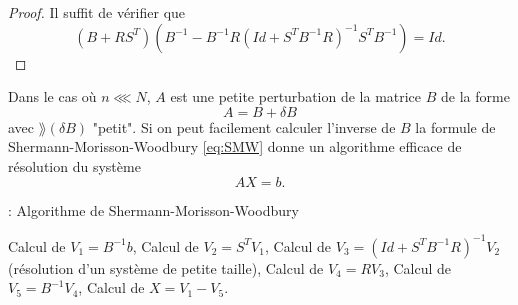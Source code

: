 \begin{proof}
Il suffit de vérifier que 
\begin{equation}
\left( B + R S^T \right) \left( B^{-1} - B^{-1} R \left( Id + S^T B^{-1} R  \right)^{-1} S^T B^{-1} \right) = Id.
\end{equation}
\end{proof}

Dans le cas où $n \lll N$, $A$ est une petite perturbation de la matrice $B$ de la forme 
\begin{equation}
A = B + \delta B
\end{equation}
avec $\rang  (\delta B) $ "petit". Si on peut facilement calculer l'inverse de $B$ la formule de Shermann-Morisson-Woodbury \eqref{eq:SMW} donne un algorithme efficace de résolution du système
\begin{equation}
A X = b.
\end{equation} 

\begin{center}
\begin{minipage}[H]{12cm}
  \begin{algorithm}[H]
    \caption{: Algorithme de Shermann-Morisson-Woodbury}\label{alg:SMW}
    \begin{algorithmic}[1]
	\State Calcul de $V_1 = B^{-1} b$,
	\State Calcul de $V_2 = S^T V_1$,
	\State Calcul de $V_3 = (Id + S^T B^{-1}R)^{-1} V_2$ (résolution d'un système de petite taille),
	\State Calcul de $V_4 = R V_3$,
	\State Calcul de $V_5 = B^{-1} V_4$,
	\State Calcul de $X = V_1 - V_5$.
    \end{algorithmic}
    \end{algorithm}
\end{minipage}
\end{center}

